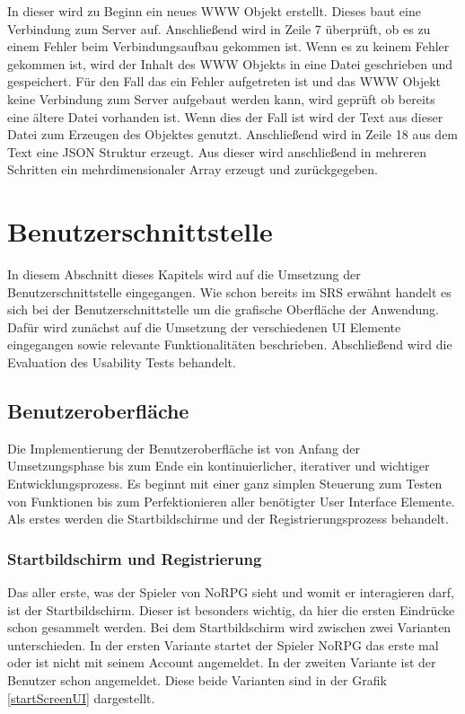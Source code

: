 				In dieser wird zu Beginn ein neues WWW Objekt erstellt. Dieses baut eine Verbindung zum Server auf. Anschließend wird in Zeile 7 überprüft, ob es zu einem Fehler beim Verbindungsaufbau gekommen ist. Wenn es zu keinem Fehler gekommen ist, wird der Inhalt des WWW Objekts in eine Datei geschrieben und gespeichert. Für den Fall das ein Fehler aufgetreten ist und das WWW Objekt keine Verbindung zum Server aufgebaut werden kann, wird geprüft ob bereits eine ältere Datei vorhanden ist. Wenn dies der Fall ist wird der Text aus dieser Datei zum Erzeugen des Objektes genutzt. Anschließend wird in Zeile 18 aus dem Text eine \ac{JSON} Struktur erzeugt. Aus dieser wird anschließend in mehreren Schritten ein mehrdimensionaler Array erzeugt und zurückgegeben.

			\section{Benutzerschnittstelle}
		In diesem Abschnitt dieses Kapitels wird auf die Umsetzung der Benutzerschnittstelle eingegangen. Wie schon bereits im \ac{SRS} erwähnt handelt es sich bei der Benutzerschnittstelle um die grafische Oberfläche der Anwendung. Dafür wird zunächst auf die Umsetzung der verschiedenen \ac{UI} Elemente eingegangen sowie relevante Funktionalitäten beschrieben. Abschließend wird die Evaluation des Usability Tests behandelt. 

		\subsection{Benutzeroberfläche}	
			Die Implementierung der Benutzeroberfläche ist von Anfang der Umsetzungsphase bis zum Ende ein kontinuierlicher, iterativer und wichtiger Entwicklungsprozess. Es beginnt mit einer ganz simplen Steuerung zum Testen von Funktionen bis zum Perfektionieren aller benötigter User Interface Elemente. Als erstes werden die Startbildschirme und der Registrierungsprozess behandelt. 

			\subsubsection{Startbildschirm und Registrierung}
				Das aller erste, was der Spieler von NoRPG sieht und womit er interagieren darf, ist der Startbildschirm. Dieser ist besonders wichtig, da hier die ersten Eindrücke schon gesammelt werden. Bei dem Startbildschirm wird zwischen zwei Varianten unterschieden. In der ersten Variante startet der Spieler NoRPG das erste mal oder ist nicht mit seinem Account angemeldet. In der zweiten Variante ist der Benutzer schon angemeldet. Diese beide Varianten sind in der Grafik \ref{startScreenUI} dargestellt.

